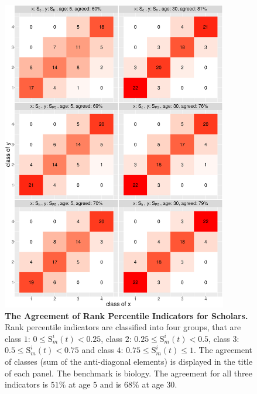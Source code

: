 \begin{refsection}
\begin{figure}[ht!]
    \centering
    \includegraphics[width=0.88\textwidth]{figures/compare_autrp/heatmap_class_agreement.eps}
    \caption{{\bf The Agreement of Rank Percentile Indicators for Scholars.} 
    Rank percentile indicators are classified into four groups, that are class $1$: $0 \le \text{S}_m^{i}(t) < 0.25$, class $2$: $0.25 \le \text{S}_m^{i}(t) < 0.5$, class $3$: $0.5 \le \text{S}_m^{i}(t) < 0.75$ and class $4$: $0.75 \le \text{S}_m^{i}(t) \le 1$. The agreement of classes (sum of the anti-diagonal elements) is displayed in the title of each panel. The benchmark is biology. The agreement for all three indicators is $51 \%$ at age $5$ and is $68 \%$ at age $30$.}
    \label{fig:aut_rp_class}
\end{figure}


\end{refsection}
